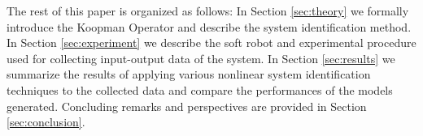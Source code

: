 The rest of this paper is organized as follows:
In Section \ref{sec:theory} we formally introduce the Koopman Operator and describe the system identification method. 
In Section \ref{sec:experiment} we describe the soft robot and experimental procedure used for collecting input-output data of the system.
In Section \ref{sec:results} we summarize the results of applying various nonlinear system identification techniques to the collected data and compare the performances of the models generated. Concluding remarks and perspectives are provided in Section \ref{sec:conclusion}.
